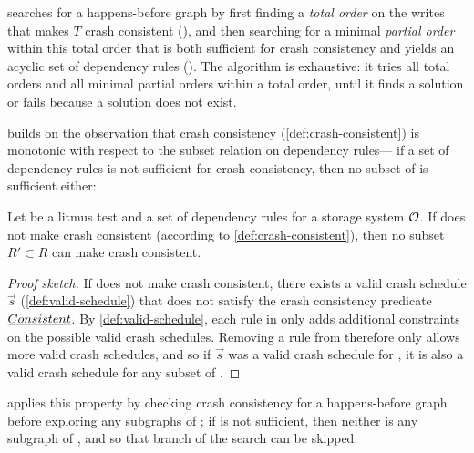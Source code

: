  searches for a happens-before graph by first finding a \emph{total
order} on the writes that makes $T$ crash consistent (\phaseone), and then
searching for a minimal \emph{partial order} within this total order that is
both sufficient for crash consistency and yields an acyclic set of dependency
rules (\phasetwo). The algorithm is exhaustive: it tries all total orders and
all minimal partial orders within a total order, until it finds a solution or
fails because a solution does not exist.

 builds on the observation that crash consistency (\cref{def:crash-consistent})
is monotonic with respect to the subset relation on dependency rules---%
if a set of dependency rules  is not sufficient for crash consistency,
then no subset of  is sufficient either:
%
\begin{theorem}\label{thm:synthesis:monotonicity}
Let \test be a litmus test
and  a set of dependency rules for a storage system $\mathcal{O}$.
If  does not make \test crash consistent (according to \cref{def:crash-consistent}),
then no subset $R' \subset R$ can make \test crash consistent.
\end{theorem}
\begin{proof}[Proof sketch]
If  does not make \test crash consistent,
there exists a valid crash schedule $\vec{s}$ (\cref{def:valid-schedule})
that does not satisfy the crash consistency predicate $\emph{Consistent}$.
By \cref{def:valid-schedule}, each rule in  only adds additional constraints on the possible valid crash schedules.
Removing a rule from  therefore only allows more valid crash schedules,
and so if $\vec{s}$ was a valid crash schedule for , it is also a valid crash schedule for any subset of .
\end{proof}
%
\noindent
{} applies this property by checking crash consistency
for a happens-before graph \gr before exploring any subgraphs of \gr;
if \gr is not sufficient, then neither is any subgraph of \gr,
and so that branch of the search can be skipped.


